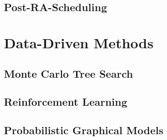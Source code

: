 \subsection{Post-RA-Scheduling}

\section{Data-Driven Methods}
\subsection{Monte Carlo Tree Search}
\subsection{Reinforcement Learning}
\subsection{Probabilistic Graphical Models}
